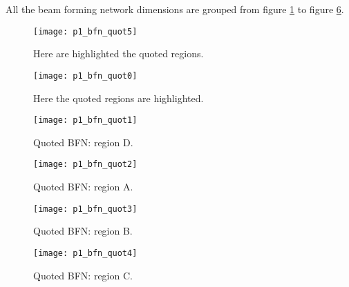 All the beam forming network dimensions are grouped from figure \ref{fig:p1_bfn_quot5} to figure \ref{fig:p1_bfn_quot4}.
\begin{figure}[t] 
	\centering
	\texttt{[image: p1\_bfn\_quot5]}
	\caption{Here are highlighted the quoted regions. }
	\label{fig:p1_bfn_quot5}
\end{figure}
\newpage 
\begin{figure}[H] 
	\centering
	\texttt{[image: p1\_bfn\_quot0]}
	\caption{Here the quoted regions are highlighted. }
	\label{fig:p1_bfn_quot0}
\end{figure}

\begin{figure}[H] 
	\centering
	\texttt{[image: p1\_bfn\_quot1]}
	\caption{Quoted BFN: region D. }
	\label{fig:p1_bfn_quot1}
\end{figure}

\begin{figure}[H] 
	\centering
	\texttt{[image: p1\_bfn\_quot2]}
	\caption{Quoted BFN: region A. }
	\label{fig:p1_bfn_quot2}
\end{figure}

\begin{figure}[H] 
	\centering
	\texttt{[image: p1\_bfn\_quot3]}
	\caption{Quoted BFN: region B. }
	\label{fig:p1_bfn_quot3}
\end{figure}

\begin{figure}[H] 
	\centering
	\texttt{[image: p1\_bfn\_quot4]}
	\caption{Quoted BFN: region C. }
	\label{fig:p1_bfn_quot4}
\end{figure}


